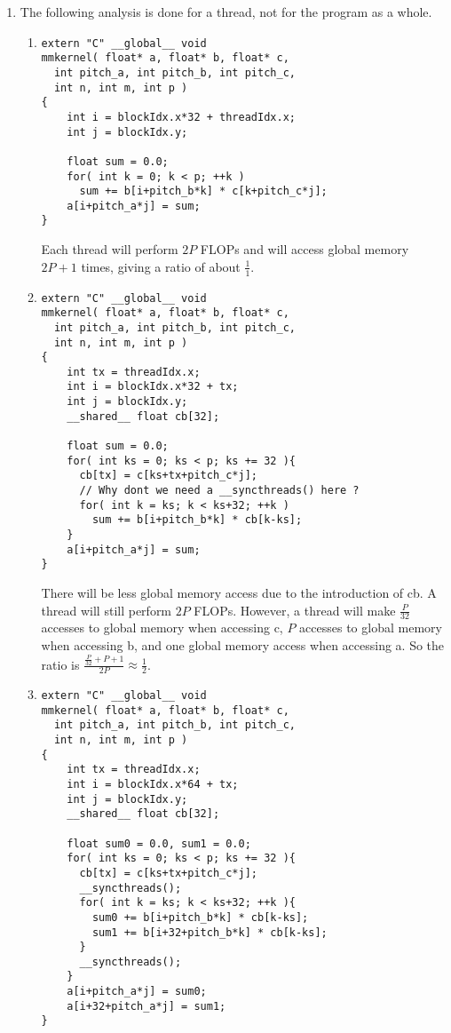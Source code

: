\documentclass[11pt]{article}
\begin{document}
\begin{enumerate}
\item The following analysis is done for a thread, not for the program as a whole.

\begin{enumerate}
\item
\begin{lstlisting}
extern "C" __global__ void
mmkernel( float* a, float* b, float* c,
  int pitch_a, int pitch_b, int pitch_c,
  int n, int m, int p )
{
    int i = blockIdx.x*32 + threadIdx.x;
    int j = blockIdx.y;

    float sum = 0.0;
    for( int k = 0; k < p; ++k ) 
      sum += b[i+pitch_b*k] * c[k+pitch_c*j];
    a[i+pitch_a*j] = sum; 
}
\end{lstlisting}

Each thread will perform $2P$ FLOPs and will access global memory $2P + 1$ times, giving a ratio of about $\frac11$.

\item
\begin{lstlisting}
extern "C" __global__ void
mmkernel( float* a, float* b, float* c,
  int pitch_a, int pitch_b, int pitch_c,
  int n, int m, int p )
{
    int tx = threadIdx.x;
    int i = blockIdx.x*32 + tx;
    int j = blockIdx.y;
    __shared__ float cb[32];

    float sum = 0.0;
    for( int ks = 0; ks < p; ks += 32 ){
      cb[tx] = c[ks+tx+pitch_c*j];
      // Why dont we need a __syncthreads() here ?
      for( int k = ks; k < ks+32; ++k )
        sum += b[i+pitch_b*k] * cb[k-ks];
    }
    a[i+pitch_a*j] = sum;
}
\end{lstlisting}	

There will be less global memory access due to the introduction of cb. A thread will still perform $2P$ FLOPs. However, a thread will make $\frac{P}{32}$ accesses to global memory when accessing c, $P$ accesses to global memory when accessing b, and one global memory access when accessing a. So the ratio is $\frac{\frac{P}{32} + P + 1}{2P} \approx \frac12$.

\item
\begin{lstlisting}
extern "C" __global__ void
mmkernel( float* a, float* b, float* c,
  int pitch_a, int pitch_b, int pitch_c,
  int n, int m, int p )
{
    int tx = threadIdx.x;
    int i = blockIdx.x*64 + tx;
    int j = blockIdx.y;
    __shared__ float cb[32];

    float sum0 = 0.0, sum1 = 0.0;
    for( int ks = 0; ks < p; ks += 32 ){
      cb[tx] = c[ks+tx+pitch_c*j];
      __syncthreads();
      for( int k = ks; k < ks+32; ++k ){
        sum0 += b[i+pitch_b*k] * cb[k-ks];
        sum1 += b[i+32+pitch_b*k] * cb[k-ks];
      }
      __syncthreads();
    }
    a[i+pitch_a*j] = sum0;
    a[i+32+pitch_a*j] = sum1;
}
\end{lstlisting}


\end{enumerate}
\end{enumerate}
\end{document}
